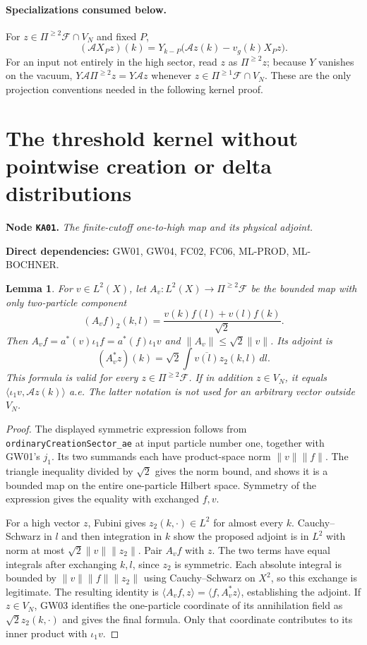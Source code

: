 \documentclass[11pt,a4paper]{article}
\newtheorem{lemma}[theorem]{Lemma}
\theoremstyle{remark}\newtheorem{remark}[theorem]{Remark}
\newcommand{\F}{\mathcal F}\newcommand{\Q}{\mathcal Q}\newcommand{\HH}{\mathcal H}
\newcommand{\node}[3]{\par\Needspace{6\baselineskip}\smallskip\hypertarget{node:#1}{}\label{nodepage:#1}\noindent\textbf{Node \texttt{#1}.} \textit{#2.}\par\noindent\textbf{Direct dependencies:} #3.\par}
\begin{document}
\paragraph{Specializations consumed below.}
For $z\in\Pi^{\geq2}\F\cap V_N$ and fixed $P$,
\begin{equation}
 (\mathcal A X_Pz)(k)
 =Y_{k-P}\bigl(\mathcal A z(k)-v_g(k)X_Pz\bigr).
 \label{eq:XfieldPT}
\end{equation}
For an input not entirely in the high sector, read $z$ as $\Pi^{\geq2}z$; because $Y$ vanishes on the vacuum, $Y\mathcal A\Pi^{\geq2}z=Y\mathcal A z$ whenever $z\in\Pi^{\geq1}\F\cap V_N$. These are the only projection conventions needed in the following kernel proof.

\section{The threshold kernel without pointwise creation or delta distributions}\label{sec:scalarkernel}
\node{KA01}{The finite-cutoff one-to-high map and its physical adjoint}{GW01, GW04, FC02, FC06, ML-PROD, ML-BOCHNER}
\begin{lemma}\label{lem:couplingadjoint}
For $v\in L^2(X)$, let $A_v:L^2(X)\to\Pi^{\geq2}\F$ be the bounded map with only two-particle component
\[
 (A_vf)_2(k,l)=\frac{v(k)f(l)+v(l)f(k)}{\sqrt2}.
\]
Then $A_vf=a^*(v)\iota_1f=a^*(f)\iota_1v$ and $\|A_v\|\leq\sqrt2\|v\|$. Its adjoint is
\[
 (A_v^*z)(k)=\sqrt2\int\overline{v(l)}z_2(k,l)\,dl.
\]
This formula is valid for every $z\in\Pi^{\geq2}\F$. If in addition $z\in V_N$, it equals $\langle\iota_1v,\mathcal Az(k)\rangle$ a.e. The latter notation is not used for an arbitrary vector outside $V_N$.
\end{lemma}
\begin{proof}
The displayed symmetric expression follows from \texttt{ordinaryCreationSector\_ae} at input particle number one, together with GW01's $j_1$. Its two summands each have product-space norm $\|v\|\|f\|$. The triangle inequality divided by $\sqrt2$ gives the norm bound, and shows it is a bounded map on the entire one-particle Hilbert space. Symmetry of the expression gives the equality with exchanged $f,v$.

For a high vector $z$, Fubini gives $z_2(k,\cdot)\in L^2$ for almost every $k$. Cauchy--Schwarz in $l$ and then integration in $k$ show the proposed adjoint is in $L^2$ with norm at most $\sqrt2\|v\|\|z_2\|$. Pair $A_vf$ with $z$. The two terms have equal integrals after exchanging $k,l$, since $z_2$ is symmetric. Each absolute integral is bounded by $\|v\|\|f\|\|z_2\|$ using Cauchy--Schwarz on $X^2$, so this exchange is legitimate. The resulting identity is $\langle A_vf,z\rangle=\langle f,A_v^*z\rangle$, establishing the adjoint. If $z\in V_N$, GW03 identifies the one-particle coordinate of its annihilation field as $\sqrt2 z_2(k,\cdot)$ and gives the final formula. Only that coordinate contributes to its inner product with $\iota_1v$.
\end{proof}
\end{document}
